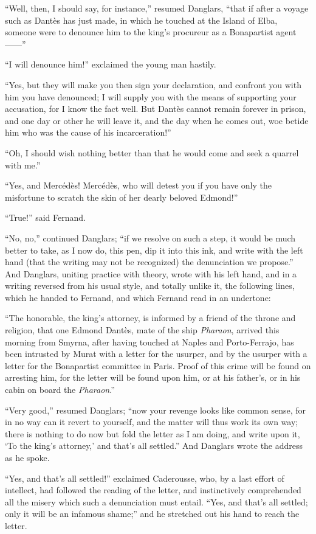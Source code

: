 “Well, then, I should say, for instance,” resumed Danglars, “that if
after a voyage such as Dantès has just made, in which he touched at the
Island of Elba, someone were to denounce him to the king’s procureur as
a Bonapartist agent——”

“I will denounce him!” exclaimed the young man hastily.

“Yes, but they will make you then sign your declaration, and confront
you with him you have denounced; I will supply you with the means of
supporting your accusation, for I know the fact well. But Dantès cannot
remain forever in prison, and one day or other he will leave it, and
the day when he comes out, woe betide him who was the cause of his
incarceration!”

“Oh, I should wish nothing better than that he would come and seek a
quarrel with me.”

“Yes, and Mercédès! Mercédès, who will detest you if you have only the
misfortune to scratch the skin of her dearly beloved Edmond!”

“True!” said Fernand.

“No, no,” continued Danglars; “if we resolve on such a step, it would
be much better to take, as I now do, this pen, dip it into this ink,
and write with the left hand (that the writing may not be recognized)
the denunciation we propose.” And Danglars, uniting practice with
theory, wrote with his left hand, and in a writing reversed from his
usual style, and totally unlike it, the following lines, which he
handed to Fernand, and which Fernand read in an undertone:

“The honorable, the king’s attorney, is informed by a friend of the
throne and religion, that one Edmond Dantès, mate of the ship
\textit{Pharaon}, arrived this morning from Smyrna, after having touched at
Naples and Porto-Ferrajo, has been intrusted by Murat with a letter for
the usurper, and by the usurper with a letter for the Bonapartist
committee in Paris. Proof of this crime will be found on arresting him,
for the letter will be found upon him, or at his father’s, or in his
cabin on board the \textit{Pharaon}.”

“Very good,” resumed Danglars; “now your revenge looks like common
sense, for in no way can it revert to yourself, and the matter will
thus work its own way; there is nothing to do now but fold the letter
as I am doing, and write upon it, ‘To the king’s attorney,’ and that’s
all settled.” And Danglars wrote the address as he spoke.

“Yes, and that’s all settled!” exclaimed Caderousse, who, by a last
effort of intellect, had followed the reading of the letter, and
instinctively comprehended all the misery which such a denunciation
must entail. “Yes, and that’s all settled; only it will be an infamous
shame;” and he stretched out his hand to reach the letter.

